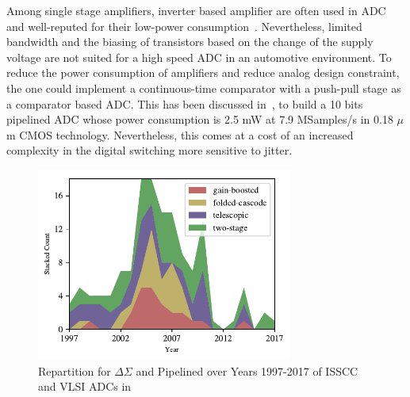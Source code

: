Among single stage amplifiers, inverter based amplifier are often used in ADC and well-reputed for their low-power consumption~\cite{Selby2013,Ismail2016}. Nevertheless, limited bandwidth and the biasing of transistors based on the change of the supply voltage are not suited for a high speed ADC in an automotive environment.
To reduce the power consumption of amplifiers and reduce analog design constraint, the one could implement a continuous-time comparator with a push-pull stage as a comparator based ADC\@. This has been discussed in~\cite{Fiorenza2006}, to build a 10 bits pipelined ADC whose power consumption is 2.5 mW at 7.9 MSamples/s in 0.18 \(\mu \)m CMOS technology. Nevertheless, this comes at a cost of an increased complexity in the digital switching more sensitive to jitter. 

\begin{figure}[htp]
    \centering
    \includegraphics[width=0.75\textwidth]{Chapter7/Figs/amplifier_repartition.pdf}
    \caption{Repartition for \(\Delta\Sigma \) and Pipelined over Years 1997-2017 of ISSCC and VLSI ADCs in \cite{MurmannSurvey}}
    \label{fig:ota_over_year}
\end{figure}

